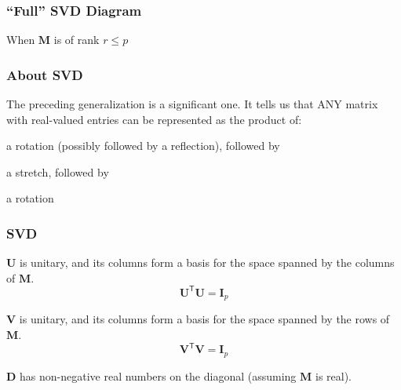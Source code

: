 \documentclass[12pt]{beamer}\usepackage[]{graphicx}\usepackage[]{color}
\begin{document}

\begin{frame}
\frametitle{``Full'' SVD Diagram}
\begin{center}

{\lolit When $\mathbf{M}$ is of rank $r \leq p$}
\end{center}
\end{frame}

  
\begin{frame}
\frametitle{About SVD}

The preceding generalization is a significant one. It tells us that ANY matrix
with real-valued entries can be represented as the product of:

\bbi
 \item a rotation (possibly followed by a reflection), followed by
 \item a stretch, followed by
 \item a rotation
\ei

\end{frame}


\begin{frame}
\frametitle{SVD}

\bbi
  \item $\mathbf{U}$ is unitary, and its columns form a basis for the space spanned by the columns of $\mathbf{M}$. \\
  $$
  \mathbf{U^\mathsf{T} U} = \mathbf{I}_{p}
  $$
  \item $\mathbf{V}$ is unitary, and its columns form a basis for the space spanned by the rows of $\mathbf{M}$. \\
  $$
  \mathbf{V^\mathsf{T} V} = \mathbf{I}_{p}
  $$
  \item $\mathbf{D}$ has non-negative real numbers on the diagonal (assuming $\mathbf{M}$ is real).
\ei

\end{frame}


\begin{frame}
\begin{center}
\Huge{}
\end{center}
\end{frame}
\end{document}
